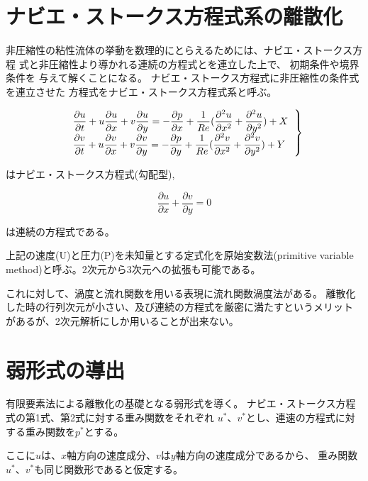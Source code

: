 \documentclass{jarticle}
\begin{document}
\section{ナビエ・ストークス方程式系の離散化}
非圧縮性の粘性流体の挙動を数理的にとらえるためには、ナビエ・ストークス方程
式と非圧縮性より導かれる連続の方程式とを連立した上で、 初期条件や境界条件を
与えて解くことになる。 ナビエ・ストークス方程式に非圧縮性の条件式を連立させた
方程式をナビエ・ストークス方程式系と呼ぶ。


\begin{equation}
\left.
\begin{tabular}{l}
$\displaystyle
\frac{\partial u}{\partial t}+u\frac{\partial u}{\partial x}+v\frac{\partial u}{\partial y} = -\frac{\partial p}{\partial x}+\frac{1}{Re}(\frac{\partial^2 u}{\partial x^2}+\frac{\partial^2 u}{\partial y^2})+X$\\
$\displaystyle  
\frac{\partial v}{\partial t}+u\frac{\partial v}{\partial x}+v\frac{\partial v}{\partial y} = -\frac{\partial p}{\partial y}+\frac{1}{Re}(\frac{\partial^2 v}{\partial x^2}+\frac{\partial^2 v}{\partial y^2})+Y$
\end{tabular}
\right\}
\end{equation}

\theequation はナビエ・ストークス方程式(勾配型),

\begin{equation}
\displaystyle
  \frac{\partial u}{\partial x}+\frac{\partial v}{\partial y} = 0
\end{equation}

\theequation は連続の方程式である。

上記の速度(U)と圧力(P)を未知量とする定式化を原始変数法(primitive variable method)と呼ぶ。2次元から3次元への拡張も可能である。

これに対して、渦度と流れ関数を用いる表現に流れ関数渦度法がある。
離散化した時の行列次元が小さい、及び連続の方程式を厳密に満たすというメリット
があるが、2次元解析にしか用いることが出来ない。


\section{弱形式の導出}

有限要素法による離散化の基礎となる弱形式を導く。
ナビエ・ストークス方程式の第1式、第2式に対する重み関数をそれぞれ
$u^*$、$v^*$とし、連速の方程式に対する重み関数を$p^*$とする。

ここに$u$は、$x$軸方向の速度成分、$v$は$y$軸方向の速度成分であるから、
重み関数$u^*$、$v^*$も同じ関数形であると仮定する。
\end{document}
